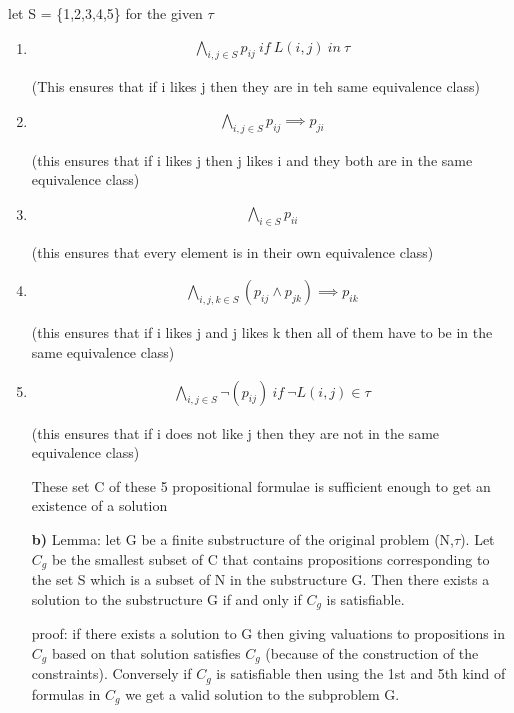 \documentclass{article}
\begin{document}
let S = \{1,2,3,4,5\} for the given $\tau$
\begin{enumerate}
    \item \begin{align*}\bigwedge_{i,j \in S} p_{ij} \ if \ L(i,j) \ in \ \tau\end{align*}
    
    (This ensures that if i likes j then they are in teh same equivalence class)
    
    \item \begin{align*}
        \bigwedge_{i,j \in S} p_{ij} \implies p_{ji} 
    \end{align*}
    
    (this ensures that if i likes j then j likes i and they both are in the same equivalence class)

    \item \begin{align*} \bigwedge_{i \in S} p_{ii} \end{align*}
    
    (this ensures that every element is in their own equivalence class)

    \item \begin{align*} \bigwedge_{i,j,k \in S} (p_{ij} \land p_{jk}) \implies p_{ik} \end{align*}
    
    (this ensures that if i likes j and j likes k then all of them have to be in the same equivalence class)

    \item \begin{align*} \bigwedge_{i,j \in S} \neg(p_{ij}) \ if \ \neg L(i,j) \in \tau \end{align*}
    
    (this ensures that if i does not like j then they are not in the same equivalence class)

    These set C of these 5 propositional formulae is sufficient enough to get an existence of a solution

    \noindent \textbf{b)} 
    Lemma: let G be a finite substructure of the original problem (N,$\tau$). Let $C_g$ be the smallest subset of C that contains propositions corresponding to the set S which is a subset of N in the substructure G. Then there exists a solution to the substructure G if and only if $C_g$ is satisfiable.

    proof: if there exists a solution to G then giving valuations to propositions in $C_g$ based on that solution satisfies $C_g$ (because of the construction of the constraints). Conversely if $C_g$ is satisfiable then using the 1st and 5th kind of formulas in $C_g$ we get a valid solution to the subproblem G.


\end{enumerate}
\end{document}

